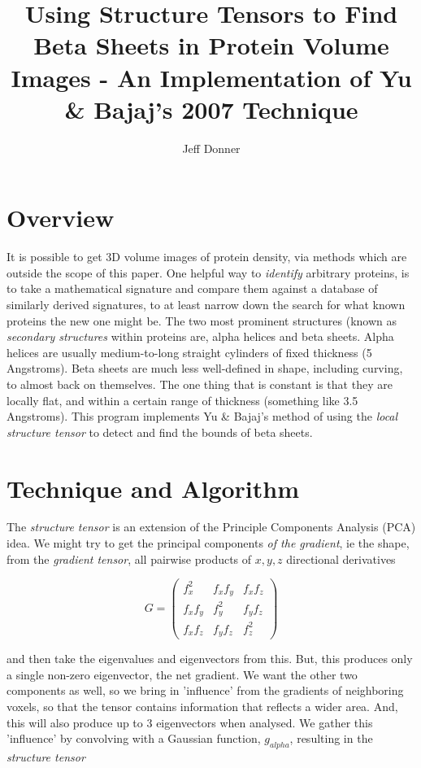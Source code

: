 \documentclass{article}
\begin{document}
\title{Using Structure Tensors to Find Beta Sheets in Protein Volume Images - An Implementation of Yu \& Bajaj's 2007 Technique}
\author{Jeff Donner}

\maketitle

\section{Overview}

It is possible to get 3D volume images of protein density, via
methods which are outside the scope of this paper. One helpful way to
\emph{identify} arbitrary proteins, is to take a mathematical signature
and compare them against a database of similarly derived signatures,
to at least narrow down the search for what known proteins the new one
might be. The two most prominent structures (known as \emph{secondary structures}
within proteins are, alpha helices and beta sheets. Alpha helices are
usually medium-to-long straight cylinders of fixed thickness (5 Angstroms).
Beta sheets are much less well-defined in shape, including curving, to almost
back on themselves. The one thing that is constant is that they are locally
flat, and within a certain range of thickness (something like 3.5 Angstroms).
This program implements Yu \& Bajaj's method \cite{yubajaj} of using the \emph{local structure
tensor} to detect and find the bounds of beta sheets.

\section{Technique and Algorithm}

The \emph{structure tensor} is an extension of the Principle Components Analysis (PCA) idea.
We might try to get the principal components \emph{of the gradient}, ie the shape, from the \emph{gradient tensor},
all pairwise products of $x, y, z$ directional derivatives

\[
  G =
\left( \begin{array}{ccc}
  f_{x}^2 & f_{x}f_{y} & f_{x}f_{z} \\
  f_{x}f_{y} & f_{y}^2 & f_{y}f_{z} \\
  f_{x}f_{z} & f_{y}f_{z} & f_{z}^2
\end{array} \right)
\]

and then take the eigenvalues and eigenvectors from this. But, this
produces only a single non-zero eigenvector, the net gradient. We want
the other two components as well, so we bring in 'influence' from the
gradients of neighboring voxels, so that the tensor contains
information that reflects a wider area. And, this will also produce up
to 3 eigenvectors when analysed. We gather this 'influence' by convolving
with a Gaussian function, $g_{alpha}$, resulting in the \emph{structure tensor}
\end{document}
